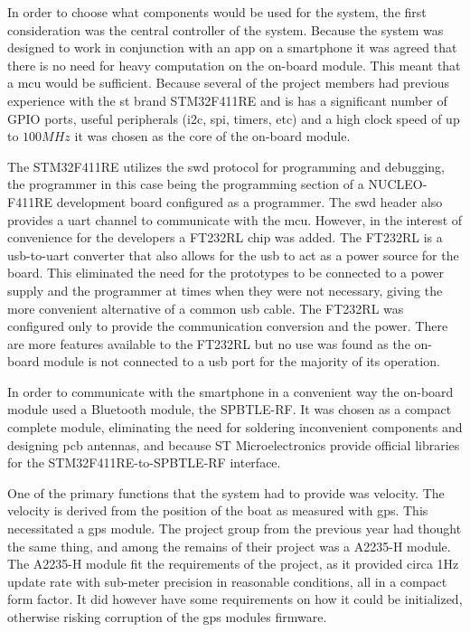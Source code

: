 In order to choose what components would be used for the system, the first consideration was the central controller of the system. Because the system was designed to work in conjunction with an app on a smartphone it was agreed that there is no need for heavy computation on the on-board module. This meant that a \gls{mcu} would be sufficient. Because several of the project members had previous experience with the \gls{st} brand STM32F411RE and is has a significant number of GPIO ports, useful peripherals (\gls{i2c}, \gls{spi}, timers, etc) and a high clock speed of up to $100MHz$ it was chosen as the core of the on-board module. 

The STM32F411RE utilizes the \gls{swd} protocol for programming and debugging, the programmer in this case being the programming section of a NUCLEO-F411RE development board configured as a programmer. The \gls{swd} header also provides a \gls{uart} channel to communicate with the \gls{mcu}. However, in the interest of convenience for the developers a FT232RL chip was added. The FT232RL is a \gls{usb}-to-\gls{uart} converter that also allows for the \gls{usb} to act as a power source for the board. This eliminated the need for the prototypes to be connected to a power supply and the programmer at times when they were not necessary, giving the more convenient alternative of a common \gls{usb} cable.  The FT232RL was configured only to provide the communication conversion and the power. There are more features available to the FT232RL but no use was found as the on-board module is not connected to a \gls{usb} port for the majority of its operation. 

In order to communicate with the smartphone in a convenient way the on-board module used a Bluetooth module, the SPBTLE-RF. It was chosen as a compact complete module, eliminating the need for soldering inconvenient components and designing \gls{pcb} antennas, and because ST Microelectronics provide official libraries for the STM32F411RE-to-SPBTLE-RF interface. 

One of the primary functions that the system had to provide was velocity. The velocity is derived from the position of the boat as measured with \gls{gps}. This necessitated a \gls{gps} module. The project group from the previous year had thought the same thing, and among the remains of their project was a A2235-H module. The A2235-H module fit the requirements of the project, as it provided circa 1Hz update rate with sub-meter precision in reasonable conditions, all in a compact form factor. It did however have some requirements on how it could be initialized, otherwise risking corruption of the \gls{gps} modules firmware. 



